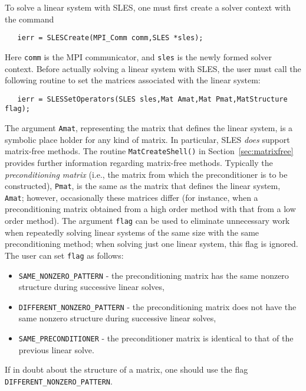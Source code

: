 To solve a linear system with SLES, one must first create a solver context 
with the command 
\begin{verbatim}
   ierr = SLESCreate(MPI_Comm comm,SLES *sles); 
\end{verbatim}
Here {\tt comm} is the MPI communicator, and {\tt sles} is the newly
formed solver context.
Before actually solving a linear system with SLES, the user must call 
the following routine to set the matrices associated with the linear
system: 
\begin{verbatim}
   ierr = SLESSetOperators(SLES sles,Mat Amat,Mat Pmat,MatStructure flag);
\end{verbatim}
The argument {\tt Amat}, representing the matrix that defines the
linear system, is a symbolic place holder for any kind of matrix.  
In particular, SLES {\em does} support matrix-free methods. 
The routine {\tt MatCreateShell()} 
in Section~\ref{sec:matrixfree} provides further information regarding
matrix-free methods. 
Typically the {\em preconditioning matrix} (i.e., the matrix from which the
preconditioner is to be constructed), {\tt Pmat}, is the same as
the matrix that defines the linear system, {\tt Amat}; however,
occasionally these matrices differ (for instance, 
when a preconditioning matrix obtained from a high order method with 
that from a low order method).
The argument {\tt flag} can be used to eliminate unnecessary work when
repeatedly solving linear systems of the same size with the same 
preconditioning method; when solving just one linear system, this flag is
ignored.  The user can set {\tt flag} as follows:
\begin{itemize}
\item {\tt SAME\_NONZERO\_PATTERN} - the preconditioning matrix has the
    same  nonzero structure during successive
    linear solves,
\item {\tt DIFFERENT\_NONZERO\_PATTERN} - the preconditioning matrix does
     not have the same nonzero structure during successive linear solves,
\item {\tt SAME\_PRECONDITIONER} - the preconditioner matrix is identical
   to that of the previous linear solve. 
\end{itemize}
If in doubt about the structure of a matrix, one should use
the flag {\tt DIFFERENT\_NONZERO\_PATTERN}.
 
